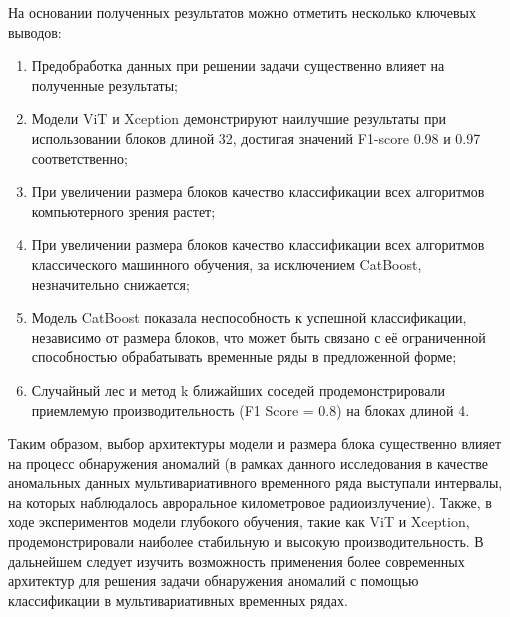\documentclass[spec, och, diploma]{SCWorks}
\begin{document}
\conclusion

    На основании полученных результатов можно отметить несколько ключевых
    выводов:
    
    \begin{enumerate}
        \item Предобработка данных при решении задачи существенно влияет на
        полученные результаты;
        \item Модели ViT и Xception демонстрируют наилучшие результаты при
        использовании блоков длиной 32, достигая значений F1-score 0.98 и 0.97
        соответственно;
        \item При увеличении размера блоков качество классификации всех
        алгоритмов компьютерного зрения растет;
        \item При увеличении размера блоков качество классификации всех
        алгоритмов классического машинного обучения, за исключением CatBoost,
        незначительно снижается;
        \item Модель CatBoost показала неспособность к успешной классификации,
        независимо от размера блоков, что может быть связано с её ограниченной
        способностью обрабатывать временные ряды в предложенной форме;
        \item Случайный лес и метод k ближайших соседей продемонстрировали
        приемлемую производительность (F1 Score = 0.8) на блоках длиной 4.
    \end{enumerate}

    Таким образом, выбор архитектуры модели и размера блока существенно влияет
    на процесс обнаружения аномалий (в рамках данного исследования в качестве
    аномальных данных мультивариативного временного ряда выступали интервалы, на
    которых наблюдалось авроральное километровое радиоизлучение). Также, в ходе
    экспериментов модели глубокого обучения, такие как ViT и Xception,
    продемонстрировали наиболее стабильную и высокую производительность. В
    дальнейшем следует изучить возможность применения более современных
    архитектур для решения задачи обнаружения аномалий с помощью классификации в
    мультивариативных временных рядах.
\end{document}
